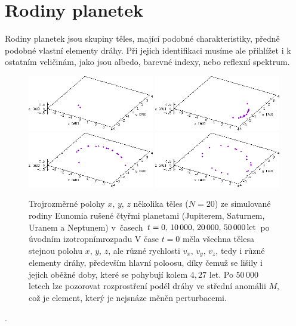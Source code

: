 \documentclass[A4paper, 12pt, oneside]{book}
\begin{document}
\pagebreak
\section{Rodiny planetek}

Rodiny planetek jsou skupiny těles, mající podobné charakteristiky, předně podobné vlastní elementy dráhy. Při jejich identifikaci musíme ale přihlížet i k ostatním veličinám, jako jsou albedo, barevné indexy, nebo reflexní spektrum. 

\immediate{}
\immediate{}
\immediate{}
\immediate{}
\begin{figure}
	\centering
	\includegraphics[width=0.49\textwidth]{obr/trajec_001t.png}
	\includegraphics[width=0.49\textwidth]{obr/trajec_101t.png} \\
	\includegraphics[width=0.49\textwidth]{obr/trajec_201t.png}
	\includegraphics[width=0.49\textwidth]{obr/trajec_501t.png}
	\caption{Trojrozměrné polohy $x,\,y,\,z$ několika těles ($N=20$) ze simulované rodiny Eunomia rušené čtyřmi planetami (Jupiterem, Saturnem, Uranem a Neptunem) v~časech $t=0,\,10\,000,\,20\,000,\,50\,000\,{\rm let}$ po úvodním izotropním\protect\footnotemark rozpadu V čase $t=0$ měla všechna tělesa stejnou polohu $x,\,y,\,z$, ale různé rychlosti $v_x,\,v_y,\,v_z$, tedy i různé elementy dráhy, především hlavní poloosu, díky čemuž se lišily i jejich oběžné doby, které se pohybují kolem $4,27$ let. Po $50\,000$ letech lze pozorovat rozprostření podél dráhy ve střední anomálii $M$, což je element, který je nejsnáze měněn perturbacemi.} \label{fig:trajec}
\end{figure}
.
\end{document}
